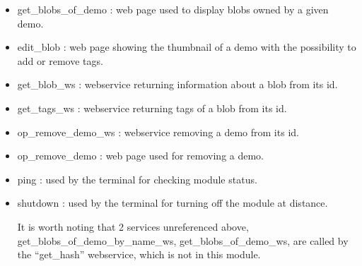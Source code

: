 \begin{itemize}
\item get\_blobs\_of\_demo : web page used to display blobs owned by a given demo.
\item edit\_blob : web page showing the thumbnail of a demo with the possibility to add or remove tags.
\item get\_blob\_ws : webservice returning information about a blob from its id.
\item get\_tags\_ws : webservice returning tags of a blob from its id.
\item op\_remove\_demo\_ws : webservice removing a demo from its id.
\item op\_remove\_demo : web page used for removing a demo.
\item ping : used by the terminal for checking module status.
\item shutdown : used by the terminal for turning off the module at distance.
  
It is worth noting that 2 services unreferenced above, get\_blobs\_of\_demo\_by\_name\_ws, get\_blobs\_of\_demo\_ws, are called by the ``get\_hash'' webservice, which is not in this module. 
  
\end{itemize}
